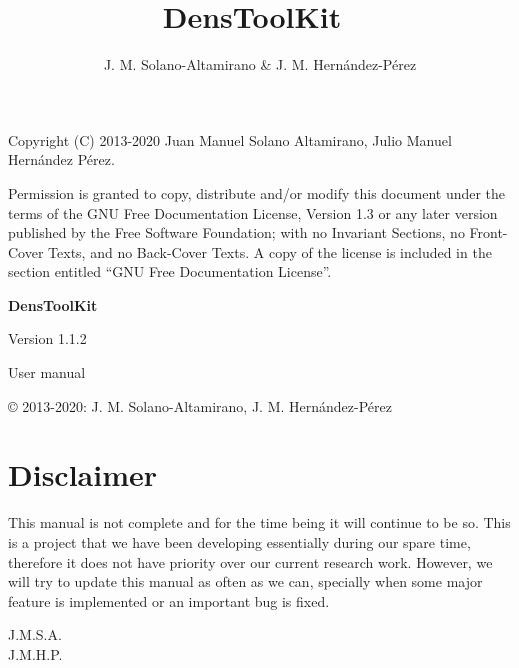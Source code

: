 \documentclass[12pt]{book}
\title{\textbf{Dens\-Tool\-Kit~\dtkversion}}
\author{J. M. Solano-Altamirano \& J. M. Hern\'andez-P\'erez}
\newcommand{\dtkversion}{1.1.2}
\begin{document}
\frontmatter
\maketitle

\newpage
\thispagestyle{empty}
\phantom{as}

\vspace{5cm}
Copyright (C) 2013-2020  Juan Manuel Solano Altamirano, Julio Manuel Hern\'andez P\'erez.

    Permission is granted to copy, distribute and/or modify this document
    under the terms of the GNU Free Documentation License, Version 1.3
    or any later version published by the Free Software Foundation;
    with no Invariant Sections, no Front-Cover Texts, and no Back-Cover Texts.
    A copy of the license is included in the section entitled ``GNU
    Free Documentation License''.
\newpage
\thispagestyle{empty}
\phantom{asf}
\vspace{5cm}
\begin{center}

{\HUGE\bf Dens\-Tool\-Kit}

\vspace{1cm}

{\Huge Version \dtkversion}

\vspace{1cm}

{\Huge User manual}

\end{center}

\vspace{8cm}
\copyright{} 2013-2020: J. M. Solano-Altamirano, J. M. Hern\'andez-P\'erez

\newpage\thispagestyle{empty}
\phantom{asd}

\vspace{50mm}

\section*{Disclaimer}

This manual is not complete and for the time being it will continue to be so. This is a project that we have been developing essentially during our spare time, therefore it does not have priority over our current research work. However, we will try to update this manual as often as we can, specially when some major feature is implemented or an important bug is fixed.

\begin{flushright} J.M.S.A. \\ J.M.H.P.\end{flushright}
\end{document}
